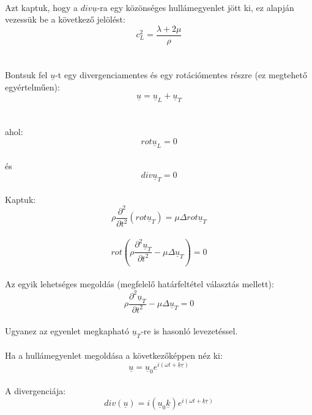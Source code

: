 \documentclass[a4paper]{article}
\begin{document}
\\
Azt kaptuk, hogy a $div \underline{u}$-ra egy közönséges hullámegyenlet jött ki, ez alapján vezessük be a következő jelölést:
\begin{equation}
c_L^{2}=\frac{\lambda +2 \mu}{\rho}
\end{equation}
\\
\\
Bontsuk fel $\underline{u}$-t egy divergenciamentes és egy rotációmentes részre (ez megtehető egyértelműen):
\begin{equation}
\underline{u}=\underline{u}_L+\underline{u}_T
\end{equation}
\\
\\
ahol:
\begin{equation}
rot \underline{u}_L=0
\end{equation}
\\
és
\begin{equation}
div\underline{u}_T=0
\end{equation}
\\
Kaptuk:
\begin{equation}
\rho \frac{\partial^{2} }{\partial t^{2}}(rot \underline{u}_T)= \mu \Delta rot \underline{u}_T
\end{equation}
\\
\begin{equation}
rot ( \rho \frac{\partial^{2} \underline{u}_T }{\partial t^{2}}- \mu \Delta  \underline{u}_T)=0
\end{equation}
\\
Az egyik lehetséges megoldás (megfelelő határfeltétel választás mellett):
\\
\begin{equation}
\rho \frac{\partial^{2} \underline{u}_T }{\partial t^{2}}- \mu \Delta  \underline{u}_T=0
\end{equation}
\\
Ugyanez az egyenlet megkapható $\underline{u}_T$-re is hasonló levezetéssel.
\\
\\
Ha a hullámegyenlet megoldása a következőképpen néz ki:
\begin{equation}
\underline{u}= \underline{u}_0 e^{i(\omega t + \underline{k} \underline{r})}
\end{equation}
\\
A divergenciája:
\begin{equation}
div (\underline{u})= i(\underline{u}_0 \underline{k}) e^{i(\omega t + \underline{k} \underline{r})}
\end{equation}
\end{document}
